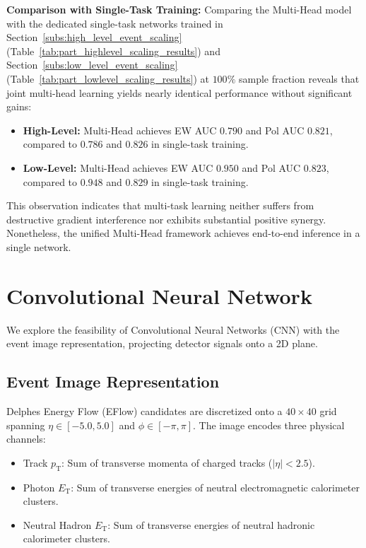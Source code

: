 \documentclass[12pt]{article}
\begin{document}
			\noindent\textbf{Comparison with Single-Task Training:}
			Comparing the Multi-Head model with the dedicated single-task networks trained in Section~\ref{subs:high_level_event_scaling} (Table~\ref{tab:part_highlevel_scaling_results}) and Section~\ref{subs:low_level_event_scaling} (Table~\ref{tab:part_lowlevel_scaling_results}) at $100\%$ sample fraction reveals that joint multi-head learning yields nearly identical performance without significant gains:
			\begin{itemize}
				\item \textbf{High-Level:} Multi-Head achieves EW AUC $0.790$ and Pol AUC $0.821$, compared to $0.786$ and $0.826$ in single-task training.
				\item \textbf{Low-Level:} Multi-Head achieves EW AUC $0.950$ and Pol AUC $0.823$, compared to $0.948$ and $0.829$ in single-task training.
			\end{itemize}
			This observation indicates that multi-task learning neither suffers from destructive gradient interference nor exhibits substantial positive synergy. Nonetheless, the unified Multi-Head framework achieves end-to-end inference in a single network.




\section{Convolutional Neural Network}%
\label{sec:convolutional_neural_network}
    
    We explore the feasibility of Convolutional Neural Networks (CNN) with the event image representation, projecting detector signals onto a 2D plane.

    \subsection{Event Image Representation}%
    \label{sub:event_image_representation}

        Delphes Energy Flow (EFlow) candidates are discretized onto a $40 \times 40$ grid spanning $\eta \in [-5.0, 5.0]$ and $\phi \in [-\pi, \pi]$. The image encodes three physical channels:
        \begin{itemize}
            \item Track $p_{\text{T}}$: Sum of transverse momenta of charged tracks ($|\eta| < 2.5$).
            \item Photon $E_{\text{T}}$: Sum of transverse energies of neutral electromagnetic calorimeter clusters.
            \item Neutral Hadron $E_{\text{T}}$: Sum of transverse energies of neutral hadronic calorimeter clusters.
        \end{itemize}
\end{document}
